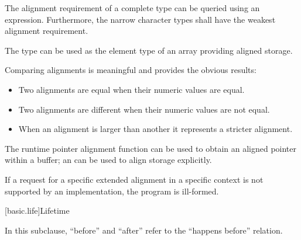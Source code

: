 \pnum
The alignment requirement of a complete type can be queried using an
 expression. Furthermore,
the narrow character types shall have the weakest
alignment requirement.
\begin{note}
The type  can be used as
the element type of an array providing aligned storage.
\end{note}

\pnum
Comparing alignments is meaningful and provides the obvious results:

\begin{itemize}
\item Two alignments are equal when their numeric values are equal.
\item Two alignments are different when their numeric values are not equal.
\item When an alignment is larger than another it represents a stricter alignment.
\end{itemize}

\pnum
\begin{note}
The runtime pointer alignment function
can be used to obtain an aligned pointer within a buffer;
an 
can be used to align storage explicitly.
\end{note}

\pnum
If a request for a specific extended alignment in a specific context is not
supported by an implementation, the program is ill-formed.

[basic.life]{Lifetime}

\pnum
In this subclause, ``before'' and ``after'' refer to the ``happens before''
relation.


